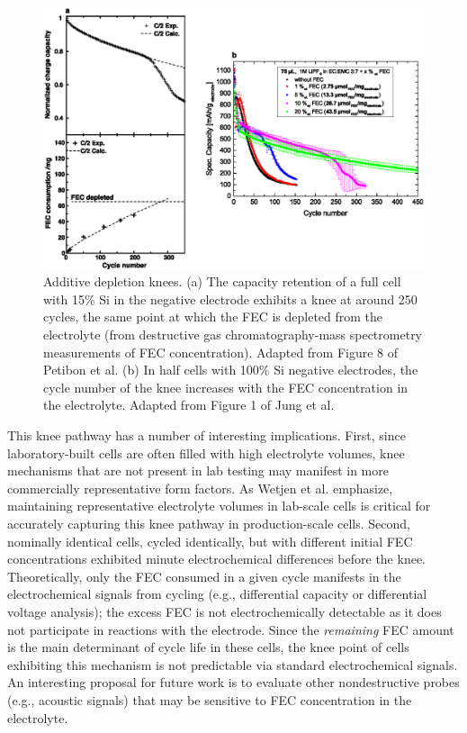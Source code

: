 \documentclass[journal=jpclcd,manuscript=article]{achemso}
\begin{document}
\begin{figure}[ht]
\centering
\includegraphics[scale = 0.9]{figures/fec_depletion.eps}
\caption{Additive depletion knees.
(a) The capacity retention of a full cell with 15\% Si in the negative electrode exhibits a knee at around 250 cycles, the same point at which the FEC is depleted from the electrolyte (from destructive gas chromatography-mass spectrometry measurements of FEC concentration). Adapted from Figure 8 of Petibon et al.\cite{petibon_studies_2016}
(b) In half cells with 100\% Si negative electrodes, the cycle number of the knee increases with the FEC concentration in the electrolyte. Adapted from Figure 1 of Jung et al.\cite{jung_consumption_2016}}
\label{fig:fec_knee}
\end{figure}

This knee pathway has a number of interesting implications.
First, since laboratory-built cells are often filled with high electrolyte volumes, knee mechanisms that are not present in lab testing may manifest in more commercially representative form factors.
As Wetjen et al.\cite{wetjen_differentiating_2017} emphasize,
maintaining representative electrolyte volumes in lab-scale cells is critical for accurately capturing this knee pathway in production-scale cells.
Second, nominally identical cells, cycled identically, but with different initial FEC concentrations exhibited minute electrochemical differences before the knee.\cite{jung_consumption_2016}
Theoretically, only the FEC consumed in a given cycle manifests in the electrochemical signals from cycling (e.g., differential capacity or differential voltage analysis); the excess FEC is not electrochemically detectable as it does not participate in reactions with the electrode.
Since the \emph{remaining} FEC amount is the main determinant of cycle life in these cells, the knee point of cells exhibiting this mechanism is not predictable via standard electrochemical signals.
An interesting proposal for future work is to evaluate other nondestructive probes (e.g., acoustic signals\cite{knehr_understanding_2018}) that may be sensitive to FEC concentration in the electrolyte.
\end{document}
